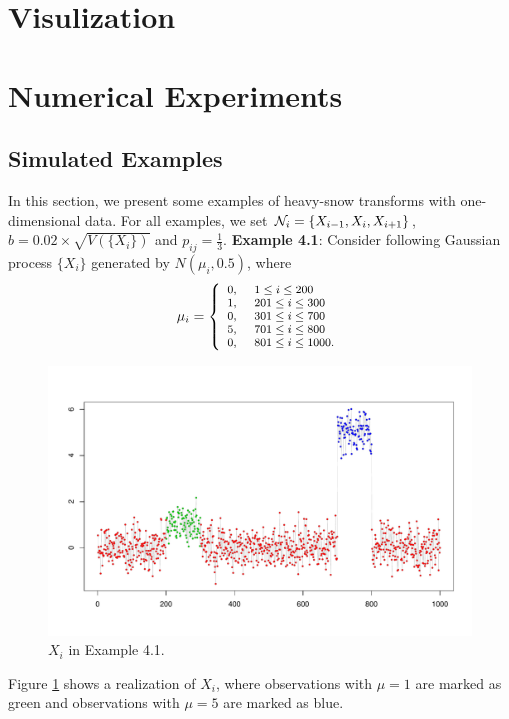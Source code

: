 \documentclass[preprint, review, 12pt]{article}
\theoremstyle{definition}
\theoremstyle{remark}
\begin{document}
\section{Visulization}

\section{Numerical Experiments}
\subsection{Simulated Examples}
In this section, we present some examples of heavy-snow transforms with one-dimensional data. For all examples, we set  ${\cal N}_i=\{X_{i-1},X_i,X_{i+1}\}$, $b=0.02\times \sqrt{V(\{X_i\})}$ and $p_{ij}=\frac{1}{3}$. 
\vskip 3mm
\noindent\textbf{Example 4.1}:
Consider following Gaussian process $\{X_i\}$ generated by $N(\mu_i,0.5)$, where 
\[
\footnotesize{\mu_i=\left\{
	\begin{array}{ll}
	0, &~1\le i \le 200\\
	1, &~201\le i \le 300\\
	0,&~301\le i \le 700\\
	5, &~701\le i \le 800\\
	0, &~801\le i \le 1000.\\
	\end{array}
	\right.}
\]
\begin{figure}
	\centering
	\includegraphics[width=1\textwidth]{Fig/snow_ex1_fig1.pdf}
	\caption{$X_i$ in Example 4.1.} 
	\label{snow:ex1_1}
\end{figure}
Figure \ref{snow:ex1_1} shows a realization of $X_i$, where observations with $\mu=1$ are marked as green and observations with $\mu=5$ are marked as blue.
\end{document}
